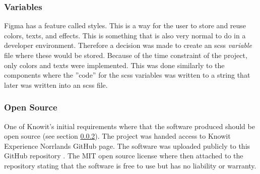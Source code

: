 



\subsubsection{Variables}%
\label{ssub:Variables}
Figma has a feature called styles. This is a way for the user to store and reuse colors, texts, and effects. This is something that is also very normal to do in a developer environment. Therefore a decision was made to create an \acrshort{scss} \textit{variable} file where these would be stored. Because of the time constraint of the project, only colors and texts were implemented. This was done similarly to the components where the ''code'' for the \acrshort{scss} variables was written to a string that later was written into an \acrshort{scss} file. 


\subsubsection{Open Source}%
\label{ssub:Open Source}
One of Knowit's initial requirements where that the software produced should be open source (see section \ref{ssub:Open Source}). The project was handed access to Knowit Experience Norrlands GitHub page. The software was uploaded publicly to this GitHub repository \cite{KnowitExperienceNorrlandFigmaConverter2021}. The MIT \cite{MITLicenseOpen} open source license where then attached to the repository stating that the software is free to use but has no liability or warranty.
 
